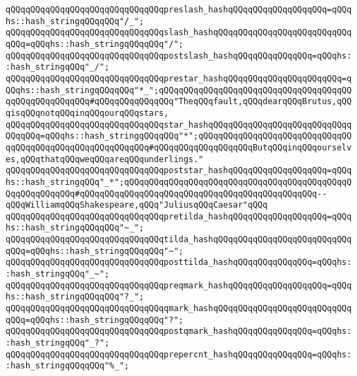 \newline
\verb|qQQqqQQqqQQqqQQqqQQqqQQqqQQqqQQqpreslash_hashqQQqqQQqqQQqqQQqqQQq=qQQqhs::hash_stringqQQqqQQq"/_";|\newline
\verb|qQQqqQQqqQQqqQQqqQQqqQQqqQQqqQQqslash_hashqQQqqQQqqQQqqQQqqQQqqQQqqQQqqQQq=qQQqhs::hash_stringqQQqqQQq"/";|\newline
\verb|qQQqqQQqqQQqqQQqqQQqqQQqqQQqqQQqpostslash_hashqQQqqQQqqQQqqQQq=qQQqhs::hash_stringqQQq"_/";|\newline
\newline
\verb|qQQqqQQqqQQqqQQqqQQqqQQqqQQqqQQqprestar_hashqQQqqQQqqQQqqQQqqQQqqQQq=qQQqhs::hash_stringqQQqqQQq"*_";qQQqqQQqqQQqqQQqqQQqqQQqqQQqqQQqqQQqqQQqqQQqqQQqqQQqqQQq#qQQqqQQqqQQqqQQq"TheqQQqfault,qQQqdearqQQqBrutus,qQQqisqQQqnotqQQqinqQQqourqQQqstars,|\newline
\verb|qQQqqQQqqQQqqQQqqQQqqQQqqQQqqQQqstar_hashqQQqqQQqqQQqqQQqqQQqqQQqqQQqqQQqqQQq=qQQqhs::hash_stringqQQqqQQq"*";qQQqqQQqqQQqqQQqqQQqqQQqqQQqqQQqqQQqqQQqqQQqqQQqqQQqqQQqqQQq#qQQqqQQqqQQqqQQqqQQqButqQQqinqQQqourselves,qQQqthatqQQqweqQQqareqQQqunderlings."|\newline
\verb|qQQqqQQqqQQqqQQqqQQqqQQqqQQqqQQqpoststar_hashqQQqqQQqqQQqqQQqqQQq=qQQqhs::hash_stringqQQq"_*";qQQqqQQqqQQqqQQqqQQqqQQqqQQqqQQqqQQqqQQqqQQqqQQqqQQqqQQqqQQq#qQQqqQQqqQQqqQQqqQQqqQQqqQQqqQQqqQQqqQQqqQQqqQQq--qQQqWilliamqQQqShakespeare,qQQq"JuliusqQQqCaesar"qQQq|\newline
\newline
\verb|qQQqqQQqqQQqqQQqqQQqqQQqqQQqqQQqpretilda_hashqQQqqQQqqQQqqQQqqQQq=qQQqhs::hash_stringqQQqqQQq"~_";|\newline
\verb|qQQqqQQqqQQqqQQqqQQqqQQqqQQqqQQqtilda_hashqQQqqQQqqQQqqQQqqQQqqQQqqQQqqQQq=qQQqhs::hash_stringqQQqqQQq"~";|\newline
\verb|qQQqqQQqqQQqqQQqqQQqqQQqqQQqqQQqposttilda_hashqQQqqQQqqQQqqQQq=qQQqhs::hash_stringqQQq"_~";|\newline
\newline
\verb|qQQqqQQqqQQqqQQqqQQqqQQqqQQqqQQqpreqmark_hashqQQqqQQqqQQqqQQqqQQq=qQQqhs::hash_stringqQQqqQQq"?_";|\newline
\verb|qQQqqQQqqQQqqQQqqQQqqQQqqQQqqQQqqmark_hashqQQqqQQqqQQqqQQqqQQqqQQqqQQqqQQq=qQQqhs::hash_stringqQQqqQQq"?";|\newline
\verb|qQQqqQQqqQQqqQQqqQQqqQQqqQQqqQQqpostqmark_hashqQQqqQQqqQQqqQQq=qQQqhs::hash_stringqQQq"_?";|\newline
\newline
\verb|qQQqqQQqqQQqqQQqqQQqqQQqqQQqqQQqprepercnt_hashqQQqqQQqqQQqqQQq=qQQqhs::hash_stringqQQqqQQq"%_";|\newline
